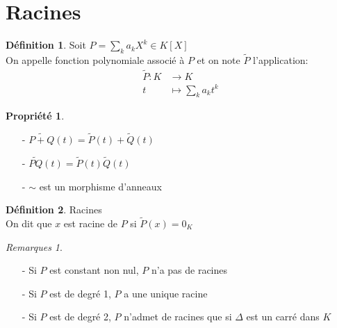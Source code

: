 \documentclass[fleqn]{article}
\theoremstyle{definition} \newtheorem*{defi}{D\'efinition}
\theoremstyle{definition} \newtheorem*{theo}{Th\'eor\`eme}
\theoremstyle{definition} \newtheorem*{coro}{Corollaire}
\theoremstyle{definition} \newtheorem*{nota}{Notation}
\theoremstyle{remark} \newtheorem*{rqs}{Remarques}
\theoremstyle{definition} \newtheorem*{prop}{Propri\'et\'e}
\begin{document}
\section{Racines}
\begin{defi} Soit $P = \sum_k a_k X^k \in K[X]$ \\
	On appelle fonction polynomiale associ\'e \`a $P$ et on note $\tilde{P}$ l'application: \begin{align*} \tilde{P}: K &\rightarrow K\\
	t &\mapsto \sum_k a_kt^k \end{align*}
\end{defi}

\begin{prop} $ $
	\begin{itemize}
		\item [-] $\tilde{P+Q}(t) = \tilde{P}(t) + \tilde{Q}(t)$
		\item [-] $\tilde{PQ}(t) = \tilde{P}(t) \tilde{Q}(t)$
		\item [-] $\sim$ est un morphisme d'anneaux
	\end{itemize}
\end{prop}

\begin{defi} Racines \\
	On dit que $x$ est racine de $P$ si $\tilde{P}(x) = 0_K$
	\begin{rqs} $ $
		\begin{itemize}
			\item [-] Si $P$ est constant non nul, $P$ n'a pas de racines
			\item [-] Si $P$ est de degr\'e 1, $P$ a une unique racine
			\item [-] Si $P$ est de degr\'e 2, $P$ n'admet de racines que si $\Delta$ est un carr\'e dans $K$
		\end{itemize}
	\end{rqs}
\end{defi}
\end{document}
